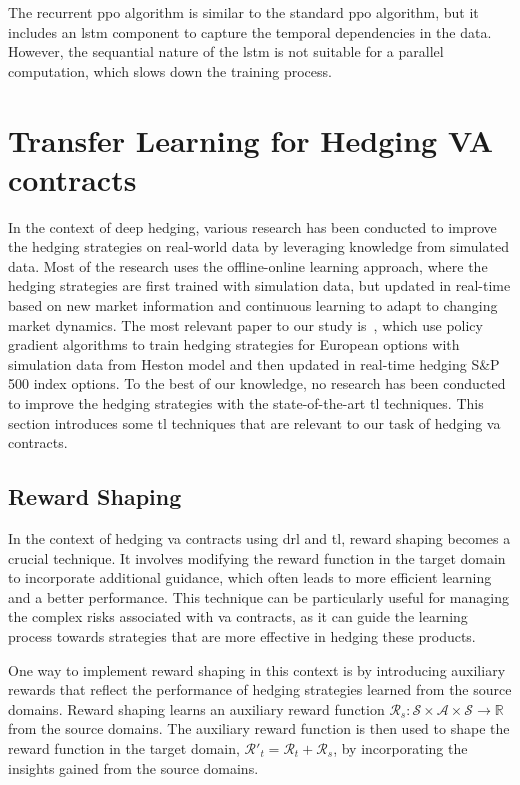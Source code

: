 The recurrent \gls{ppo} algorithm is similar to the standard \gls{ppo} algorithm, but it includes an \gls{lstm} component to capture the temporal dependencies in the data.
However, the sequantial nature of the \gls{lstm} is not suitable for a parallel computation, which slows down the training process.

\section{Transfer Learning for Hedging VA contracts} \label{sec:TransferLearning}

In the context of deep hedging, various research has been conducted to improve the hedging strategies on real-world data by leveraging knowledge from simulated data.
Most of the research uses the offline-online learning approach, where the hedging strategies are first trained with simulation data, but updated in real-time based on new market information and continuous learning to adapt to changing market dynamics.
The most relevant paper to our study is~\cite{xiao2021optimal}, which use policy gradient algorithms to train hedging strategies for European options with simulation data from Heston model and then updated in real-time hedging S\&P 500 index options.
To the best of our knowledge, no research has been conducted to improve the hedging strategies with the state-of-the-art \gls{tl} techniques.
This section introduces some \gls{tl} techniques that are relevant to our task of hedging \gls{va} contracts.

\subsection{Reward Shaping}

In the context of hedging \gls{va} contracts using \gls{drl} and \gls{tl}, reward shaping becomes a crucial technique. 
It involves modifying the reward function in the target domain to incorporate additional guidance, which often leads to more efficient learning and a better performance.
This technique can be particularly useful for managing the complex risks associated with \gls{va} contracts, as it can guide the learning process towards strategies that are more effective in hedging these products.

One way to implement reward shaping in this context is by introducing auxiliary rewards that reflect the performance of hedging strategies learned from the source domains.
Reward shaping learns an auxiliary reward function $\mathcal{R}_s: \mathcal{S} \times \mathcal{A} \times \mathcal{S} \rightarrow \mathbb{R}$ from the source domains.
The auxiliary reward function is then used to shape the reward function in the target domain, $\mathcal{R}'_t = \mathcal{R}_t + \mathcal{R}_s$, by incorporating the insights gained from the source domains.


